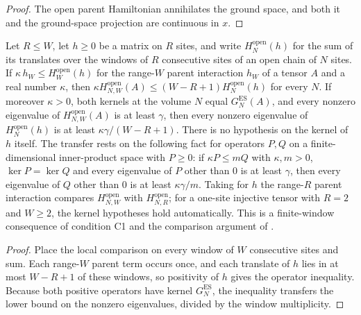 \begin{proof}
    \leanok
    The open parent Hamiltonian annihilates the ground space, and both it and
    the ground-space projection are continuous in $x$.
\end{proof}

\begin{lemma}
    \label{lem:open_parent_range_comparison}
    \leanok
    Let $R\leq W$, let $h\geq0$ be a matrix on $R$ sites, and write
    $H^{\mathrm{open}}_N(h)$ for the sum of its translates over the windows
    of $R$ consecutive sites of an open chain of $N$ sites. If
    $\kappa\,h_W\leq H^{\mathrm{open}}_W(h)$ for the range-$W$ parent
    interaction $h_W$ of a tensor $A$ and a real number $\kappa$, then
    $\kappa H^{\mathrm{open}}_{N,W}(A)\leq(W-R+1)H^{\mathrm{open}}_N(h)$
    for every $N$. If moreover $\kappa>0$, both kernels at the volume
    $N$ equal $G_N^{\mathrm{ES}}(A)$, and every nonzero eigenvalue of
    $H^{\mathrm{open}}_{N,W}(A)$ is at least $\gamma$, then every nonzero
    eigenvalue of $H^{\mathrm{open}}_N(h)$ is at least
    $\kappa\gamma/(W-R+1)$. There is no hypothesis on the kernel of $h$
    itself. The transfer rests on the following fact for operators $P,Q$ on
    a finite-dimensional inner-product space with $P\geq0$: if
    $\kappa P\leq mQ$ with $\kappa,m>0$, $\ker P=\ker Q$ and every
    eigenvalue of $P$ other than $0$ is at least $\gamma$, then every
    eigenvalue of $Q$ other than $0$ is at least $\kappa\gamma/m$. Taking for $h$ the range-$R$ parent interaction compares
    $H^{\mathrm{open}}_{N,W}$ with $H^{\mathrm{open}}_{N,R}$; for a one-site
    injective tensor with $R=2$ and $W\geq2$, the kernel hypotheses hold
    automatically. This is a finite-window consequence of condition C1 and
    the comparison argument of \cite{Nachtergaele1996Spectral}.
\end{lemma}

\begin{proof}
    \leanok
    Place the local comparison on every window of $W$ consecutive sites and
    sum. Each range-$W$ parent term occurs once, and each translate of $h$
    lies in at most $W-R+1$ of these windows, so positivity of $h$ gives the
    operator inequality. Because both positive operators have kernel
    $G_N^{\mathrm{ES}}$, the inequality transfers the lower bound on the
    nonzero eigenvalues, divided by the window multiplicity.
\end{proof}

